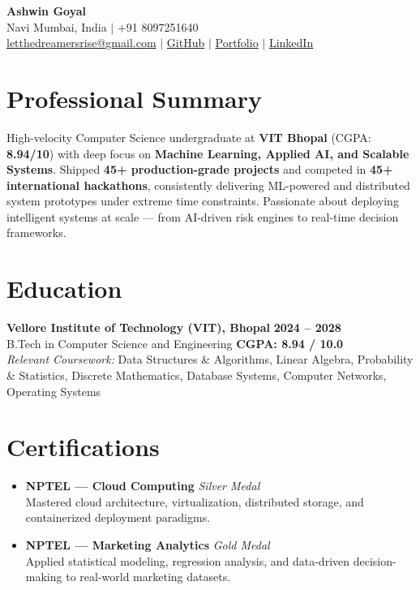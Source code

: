 \documentclass[a4paper,10pt]{article}
\begin{document}
\vspace*{10pt} %

\begin{center}
    {\Huge \textbf{Ashwin Goyal}} \\[8pt]
    Navi Mumbai, India \quad $|$ \quad +91 8097251640 \\ [4pt]
    \href{mailto:letthedreamersrise@gmail.com}{letthedreamersrise@gmail.com} \quad $|$ \quad
    \href{https://github.com/let-the-dreamers-rise/}{GitHub} \quad $|$ \quad
    \href{https://resumeashwin.vercel.app/}{Portfolio} \quad $|$ \quad
    \href{https://www.linkedin.com/in/ashwin-goyal-8940a8327/}{LinkedIn}
\end{center}

\section{Professional Summary}
High-velocity Computer Science undergraduate at \textbf{VIT Bhopal} (CGPA: \textbf{8.94/10}) with deep focus on \textbf{Machine Learning, Applied AI, and Scalable Systems}. Shipped \textbf{45+ production-grade projects} and competed in \textbf{45+ international hackathons}, consistently delivering ML-powered and distributed system prototypes under extreme time constraints. Passionate about deploying intelligent systems at scale --- from AI-driven risk engines to real-time decision frameworks. 
\section{Education}
\textbf{Vellore Institute of Technology (VIT), Bhopal} \hfill \textbf{2024 -- 2028} \\
B.Tech in Computer Science and Engineering \hfill \textbf{CGPA: 8.94 / 10.0} \\[2pt]
\textit{Relevant Coursework:} Data Structures \& Algorithms, Linear Algebra, Probability \& Statistics, Discrete Mathematics, Database Systems, Computer Networks, Operating Systems

\section{Certifications}
\begin{itemize}
    \item \textbf{NPTEL --- Cloud Computing} \hfill \textit{Silver Medal} \\
    Mastered cloud architecture, virtualization, distributed storage, and containerized deployment paradigms.
    \item \textbf{NPTEL --- Marketing Analytics} \hfill \textit{Gold Medal} \\
    Applied statistical modeling, regression analysis, and data-driven decision-making to real-world marketing datasets.
\end{itemize}
\end{document}
